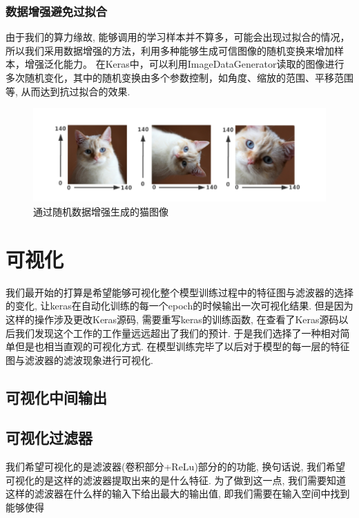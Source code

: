 \documentclass[lang=cn,11pt]{elegantpaper}
\begin{document}
\subsubsection{数据增强避免过拟合}
由于我们的算力缘故, 能够调用的学习样本并不算多，可能会出现过拟合的情况，所以我们采用数据增强的方法，利用多种能够生成可信图像的随机变换来增加样本，增强泛化能力。 在Keras中，可以利用ImageDataGenerator读取的图像进行多次随机变化，其中的随机变换由多个参数控制，如角度、缩放的范围、平移范围等, 从而达到抗过拟合的效果.

\begin{figure}[hbtp]
\centering
  \includegraphics{aug.png}
  \caption{通过随机数据增强生成的猫图像\label{fig:augcat}}
\end{figure}



\section{可视化}

我们最开始的打算是希望能够可视化整个模型训练过程中的特征图与滤波器的选择的变化, 让keras在自动化训练的每一个epoch的时候输出一次可视化结果. 但是因为这样的操作涉及更改Keras源码, 需要重写keras的训练函数, 在查看了Keras源码以后我们发现这个工作的工作量远远超出了我们的预计. 于是我们选择了一种相对简单但是也相当直观的可视化方式. 在模型训练完毕了以后对于模型的每一层的特征图与滤波器的滤波现象进行可视化.



\subsection{可视化中间输出}




\subsection{可视化过滤器}

我们希望可视化的是滤波器(卷积部分+ReLu)部分的的功能, 换句话说, 我们希望可视化的是这样的滤波器提取出来的是什么特征. 为了做到这一点, 我们需要知道这样的滤波器在什么样的输入下给出最大的输出值, 即我们需要在输入空间中找到能够使得




\newpage
\nocite{*}



\end{document}
